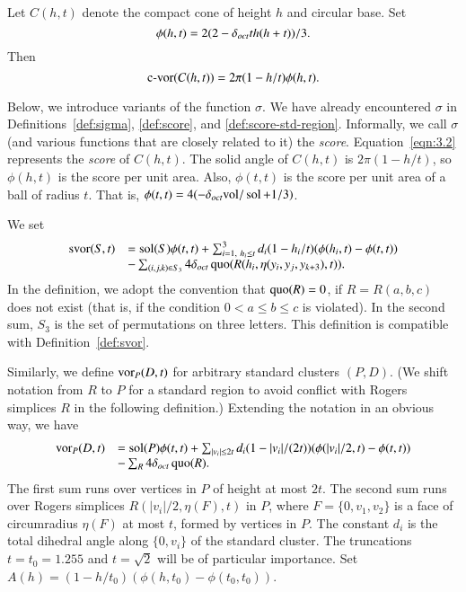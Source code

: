 \begin{definition}\label{def:cone}
 Let $C(h,t)$ denote the compact cone of height $h$
and circular base. Set
    $$
    \phi(h,t)=2(2-\delta_{oct}  t h (h+t))/3.
    $$
 Then
    \begin{equation}
    {\operatorname{c-vor}}(C(h,t))=2\pi(1-h/t)\phi(h,t).
    \label{eqn:3.2}
    \end{equation}
 \end{definition}


\begin{remark}\label{remark:score}
Below, we introduce variants of the function $\sigma$. We have
already encountered $\sigma$ in Definitions~\ref{def:sigma},
\ref{def:score}, and \ref{def:score-std-region}. Informally, we
call $\sigma$ (and various functions that are closely related to
it) the {\it score}. Equation~\ref{eqn:3.2} represents the {\it
score\/} of $C(h,t)$. The solid angle of $C(h,t)$ is
$2\pi(1-h/t)$, so $\phi(h,t)$ is the score per unit area. Also,
$\phi(t,t)$ is the score per unit area of a ball of radius $t$.
That is, $\phi(t,t) = 4(-\delta_{oct}{\operatorname{vol}}/\operatorname{sol} + 1/3)$.
\end{remark}


We set
    \begin{equation}
    \begin{array}{lll}
    \operatorname{svor}(S,t) &=
    \operatorname{sol}(S)\phi(t,t)
    +\sum_{i=1,\ h_i\le t}^3 d_i (1-h_i/t) (\phi(h_i,t)-
    \phi(t,t)) \\
    &-\sum_{(i,j,k)\in S_3}
    4\delta_{oct}
    \operatorname{quo}(R(h_i,\eta(y_i,y_j,y_{k+3}),t)).
    \label{eqn:3.5}
    \end{array}
    \end{equation}
In the definition, we adopt the convention that $\operatorname{quo}(R)=0$, if
$R=R(a,b,c)$ does not exist (that is, if the condition
    $0< a\le b\le c$
is violated). In the second sum, $S_3$ is the set of permutations
on three letters. This definition is compatible with
Definition~\ref{def:svor}.

Similarly, we define $\operatorname{vor}_P(D,t)$ for arbitrary standard clusters
$(P,D)$.  (We shift notation from $R$ to $P$ for a standard region
to avoid conflict with Rogers simplices $R$ in the following
definition.)  Extending the notation in an obvious way, we have
    \begin{equation}
    \begin{array}{lll}
    \operatorname{vor}_P(D,t) &=
    \operatorname{sol}(P)\phi(t,t)
    +\sum_{|v_i|\le 2t} d_i (1-|v_i|/(2t)) (\phi(|v_i|/2,t)-
    \phi(t,t)) \\
    &-\sum_{R} 4\delta_{oct} \operatorname{quo}(R).
    \label{eqn:3.7}
    \end{array}
    \end{equation}
The first sum runs over vertices in $P$ of height at most $2t$.
The second sum runs over Rogers simplices $R(|v_i|/2,\eta(F),t)$
in $P$, where $F=\{0,v_1,v_2\}$ is a face of circumradius
$\eta(F)$ at most $t$, formed by vertices in $P$.  The constant
$d_i$ is the total dihedral angle along $\{0,v_i\}$ of the
standard cluster. The truncations $t=t_0=1.255$ and $t=\sqrt2$
will be of particular importance.
    Set $A(h) = (1-h/t_0) (\phi(h,t_0)-\phi(t_0,t_0))$.

